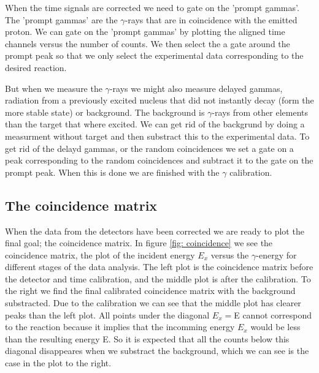 \documentclass[11pt,a4wide]{article}
\begin{document}
When the time signals are corrected we need to gate on the 'prompt gammas'. The 'prompt gammas' are the $\gamma$-rays that are in coincidence with the emitted proton. We can gate on the 'prompt gammas' by plotting the aligned time channels versus the number of counts. We then select the a  gate around the prompt peak so that we only select the experimental data corresponding to the desired reaction. 

But when we measure the $\gamma$-rays we might also measure delayed gammas, radiation from a previously excited nucleus that did not instantly decay (form the more stable state) or background. The background is $\gamma$-rays from other elements than the target that where excited. We can get rid of the backgrund by doing a measurment without target and then substract this to the experimental data. To get rid of the delayd gammas, or the random coincidences we set a gate on a peak corresponding to the random coincidences and subtract it to the gate on the prompt peak. When this is done we are finished with the $\gamma$ calibration.


\subsection{ The coincidence matrix}
When the data from the detectors have been corrected we are ready to plot the final goal; the coincidence matrix. In figure \ref{fig: coincidence} we see the coincidence matrix, the plot of the incident energy $E_x$ versus the $\gamma$-energy for different stages of the data analysis. The left plot is the coincidence matrix before the detector and time calibration, and the middle plot is after the calibration. To the right we find the final calibrated coincidence matrix with the background substracted. Due to the calibration we can see that the middle plot has clearer peaks than the left plot. All points under the diagonal $E_x=$E cannot correspond to the reaction because it implies that the incomming energy $E_x$ would be less than the resulting energy E. So it is expected that all the counts below this diagonal disappeares when we substract the background, which we can see is the case in the plot to the right. 
\end{document}
